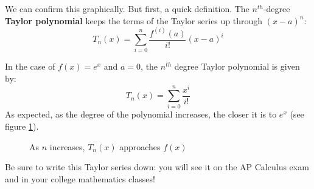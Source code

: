 We can confirm this graphically. But first, a quick definition. The $n^{th}$-degree
\textbf{Taylor polynomial} keeps the terms of the
Taylor series up through $(x-a)^n$:
$$T_n(x) = \sum_{i=0}^n \frac{f^{(i)}(a)}{i!}(x - a)^i$$

In the case of $f(x) = e^x$ and $a = 0$, the $n^{th}$ degree Taylor polynomial
is given by:
$$T_n(x) = \sum_{i = 0}^n \frac{x^i}{i!}$$
As expected, as the degree of the polynomial increases, the closer it is to 
$e^x$ (see figure \ref{taylorexp}).

\begin{figure}[H]
\centering
    \caption{As $n$ increases, $T_n(x)$ approaches $f(x)$}
    \label{taylorexp}
\end{figure}

Be sure to write this Taylor series down: you will see it on the AP Calculus 
exam and in your college mathematics classes!

